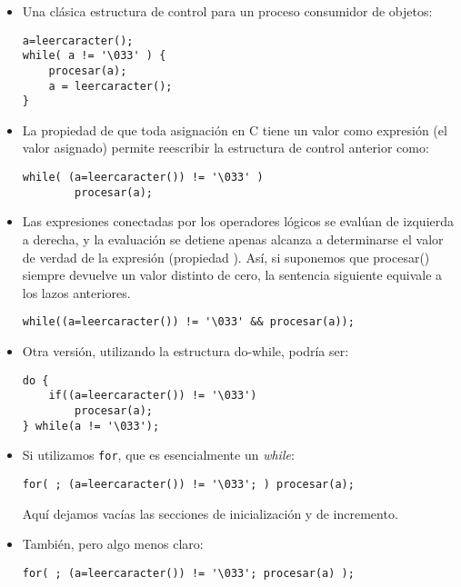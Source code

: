 \begin{ejemplo}
\begin{itemize}
\item Una clásica estructura de control para un proceso consumidor de objetos:
\begin{lstlisting}
a=leercaracter();
while( a != '\033' ) {
    procesar(a);
    a = leercaracter();
}
\end{lstlisting}

\item La propiedad de que toda asignación en C tiene un valor como expresión (el valor
asignado) permite reescribir la estructura de control anterior como:

\begin{lstlisting}
while( (a=leercaracter()) != '\033' )
        procesar(a);
\end{lstlisting}

\item Las expresiones conectadas por los operadores lógicos se evalúan de izquierda a
derecha, y la evaluación se detiene apenas alcanza a determinarse el valor de
verdad de la expresión (propiedad ). Así, si suponemos que
procesar() siempre devuelve un valor distinto de cero, la sentencia siguiente equivale a los lazos anteriores.

\begin{lstlisting}
while((a=leercaracter()) != '\033' && procesar(a));
\end{lstlisting}
\item Otra versión, utilizando la estructura do-while, podría ser:
\begin{lstlisting}
do {
    if((a=leercaracter()) != '\033')
        procesar(a);
} while(a != '\033');
\end{lstlisting}

\item Si utilizamos \texttt{for}, que es esencialmente un \textit{while}:

\begin{lstlisting}
for( ; (a=leercaracter()) != '\033'; ) procesar(a);
\end{lstlisting}

Aquí dejamos vacías las secciones de inicialización y de incremento. 
\item También, pero algo menos claro:

\begin{lstlisting}
for( ; (a=leercaracter()) != '\033'; procesar(a) );
\end{lstlisting}
\end{itemize}
\end{ejemplo}

